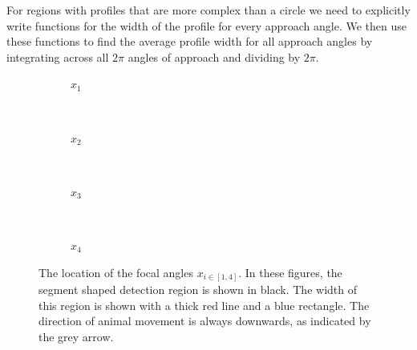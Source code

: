 For regions with profiles that are more complex than a circle we need to explicitly write functions for the width of the profile for every approach angle. We then use these functions to find the average profile width for all approach angles by integrating across all $2\pi$ angles of approach and dividing by $2\pi$. 



\begin{figure}[t]
        \centering
        \begin{subfigure}[t]{0.34\textwidth}
                \centering
                \caption{$x_1$}
                \label{f:tikz1}
        \end{subfigure}
        ~ 
        \begin{subfigure}[t]{0.22\textwidth}
                \centering
                \caption{$x_2$}
                \label{f:x2}
        \end{subfigure}
        ~ 
	\begin{subfigure}[t]{0.22\textwidth}
                \centering
                \caption{$x_3$}
                \label{f:x3}
        \end{subfigure}%
	~
	\begin{subfigure}[t]{0.22\textwidth}
                \centering
                \caption{$x_4$}
                \label{f:x4}
        \end{subfigure}%
\caption{The location of the focal angles $x_{i\in[1,4]}$. In these figures, the segment shaped detection region is shown in black. The width of this region is shown with a thick red line and a blue rectangle. The direction of animal movement is always downwards, as indicated by the grey arrow.}
\label{f:xis}
\end{figure}



